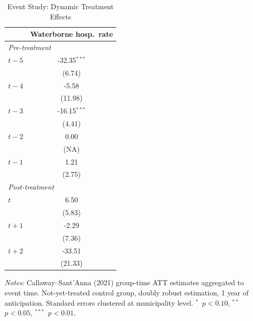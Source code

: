 \begin{table}[H]
\centering
\caption{Event Study: Dynamic Treatment Effects}
\label{tab:eventstudy}
\begin{threeparttable}
\begin{tabular}{lc}
\toprule
 & Waterborne hosp.\ rate \\
\midrule
\multicolumn{2}{l}{\textit{Pre-treatment}} \\
  $t-5$ & -32.35$^{***}$ \\
  & (6.74) \\
  $t-4$ & -5.58 \\
  & (11.98) \\
  $t-3$ & -16.15$^{***}$ \\
  & (4.41) \\
  $t-2$ & 0.00 \\
  & (NA) \\
  $t-1$ & 1.21 \\
  & (2.75) \\
\midrule
\multicolumn{2}{l}{\textit{Post-treatment}} \\
  $t$ & 6.50 \\
  & (5.83) \\
  $t+1$ & -2.29 \\
  & (7.36) \\
  $t+2$ & -33.51 \\
  & (21.33) \\
\bottomrule
\end{tabular}
\begin{tablenotes}[flushleft]
\small
\item \textit{Notes:} Callaway--Sant'Anna (2021) group-time ATT estimates aggregated to event time. Not-yet-treated control group, doubly robust estimation, 1 year of anticipation. Standard errors clustered at municipality level. $^{*}$~$p<0.10$, $^{**}$~$p<0.05$, $^{***}$~$p<0.01$.
\end{tablenotes}
\end{threeparttable}
\end{table}
